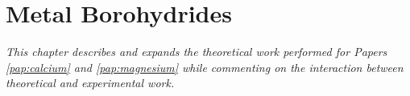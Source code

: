 \chapter{Metal Borohydrides}
\label{chap:borohydrides}
\textit{This chapter describes and expands the theoretical work performed for Papers \ref{pap:calcium} and \ref{pap:magnesium} while commenting on the interaction between theoretical and experimental work.}






